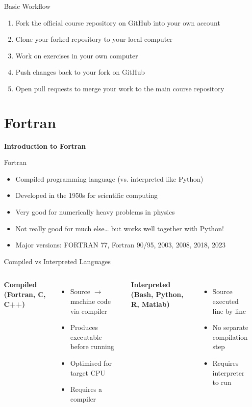 \begin{frame}{Basic Workflow}
	\begin{enumerate}
		\item Fork the official course repository on GitHub into your own account
		\item Clone your forked repository to your local computer
		\item Work on exercises in your own computer
		\item Push changes back to your fork on GitHub
		\item Open pull requests to merge your work to the main course repository
	\end{enumerate}
\end{frame}

\section{Fortran}

\begin{frame}
	\centering
	\Huge \textbf{Introduction to Fortran}
\end{frame}

\begin{frame}{Fortran}
	\begin{itemize}
		\item Compiled programming language (vs. interpreted like Python)
		\item Developed in the 1950s for scientific computing
		\item Very good for numerically heavy problems in physics
		\item Not really good for much else… but works well together with Python!
		\item Major versions: FORTRAN 77, Fortran 90/95, 2003, 2008, 2018, 2023
	\end{itemize}
\end{frame}



\begin{frame}{Compiled vs Interpreted Languages}
	\begin{columns}[T]
		\textbf{Compiled (Fortran, C, C++)}
		\begin{itemize}
			\item Source $\to$ machine code via compiler
			\item Produces executable before running
			\item Optimised for target CPU
			\item Requires a compiler
		\end{itemize}
		
		\textbf{Interpreted (Bash, Python, R, Matlab)}
		\begin{itemize}
			\item Source executed line by line
			\item No separate compilation step
			\item Requires interpreter to run
		\end{itemize}
	\end{columns}
\end{frame}


